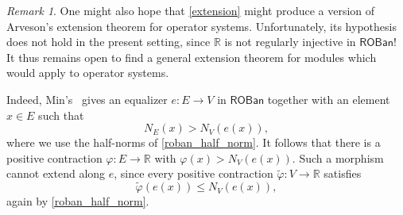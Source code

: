 \documentclass[11pt,onecolumn]{article}
\newcommand{\R}{\mathbb{R}}
\newcommand{\ROBan}{\mathsf{ROBan}}
\theoremstyle{plain}
\theoremstyle{remark}
\newtheorem{remark}[remark]{Remark}
\theoremstyle{definition}
\begin{document}
\begin{remark}
	\label{rem:op_sys_extension}
	One might also hope that \cref{extension} might produce a version of Arveson's extension theorem for operator systems.
	Unfortunately, its hypothesis does not hold in the present setting, since $\R$ is not regularly injective in $\ROBan$!
	It thus remains open to find a general extension theorem for modules which would apply to operator systems.

	Indeed, Min's~\cite[Section~5.3, Counterexample~(2)]{MinExponentialLaw}
	gives an equalizer $e\colon E\to V$ in $\ROBan$ together with an element $x\in E$ such that
	\[
		N_E(x)>N_V(e(x)),
	\]
	where we use the half-norms of \cref{roban_half_norm}.
	It follows that there is a positive contraction $\varphi\colon E\to\R$ with $\varphi(x)>N_V(e(x))$.
	Such a morphism cannot extend along $e$, since every positive contraction $\widetilde{\varphi}\colon V\to\R$ satisfies
	\[
		\widetilde{\varphi}(e(x))\le N_V(e(x)),
	\]
	again by \cref{roban_half_norm}.
\end{remark}
\end{document}
